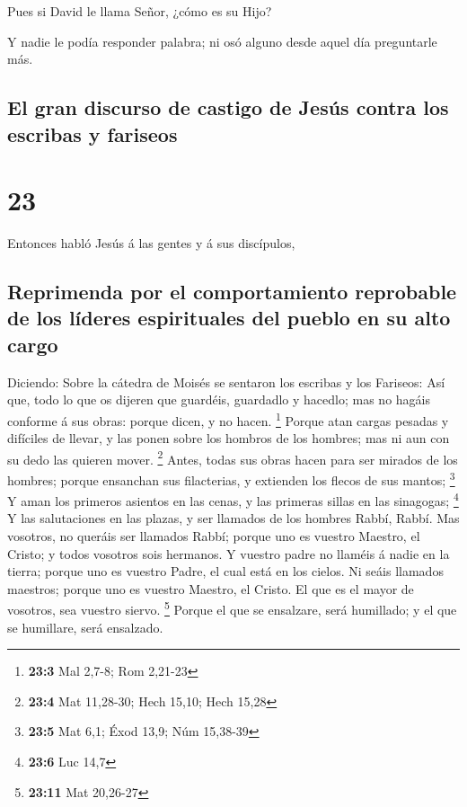  Pues si David le llama Señor, ¿cómo es su Hijo?

 Y nadie le podía responder palabra; ni osó alguno desde
aquel día preguntarle más.

\hypertarget{el-gran-discurso-de-castigo-de-jesuxfas-contra-los-escribas-y-fariseos}{%
\subsection{El gran discurso de castigo de Jesús contra los escribas y
fariseos}\label{el-gran-discurso-de-castigo-de-jesuxfas-contra-los-escribas-y-fariseos}}

\hypertarget{section-22}{%
\section{23}\label{section-22}}

 Entonces habló Jesús á las gentes y á sus discípulos,

\hypertarget{reprimenda-por-el-comportamiento-reprobable-de-los-luxedderes-espirituales-del-pueblo-en-su-alto-cargo}{%
\subsection{Reprimenda por el comportamiento reprobable de los líderes
espirituales del pueblo en su alto
cargo}\label{reprimenda-por-el-comportamiento-reprobable-de-los-luxedderes-espirituales-del-pueblo-en-su-alto-cargo}}

 Diciendo: Sobre la cátedra de Moisés se sentaron los
escribas y los Fariseos:  Así que, todo lo que os dijeren
que guardéis, guardadlo y hacedlo; mas no hagáis conforme á sus obras:
porque dicen, y no hacen. \footnote{\textbf{23:3} Mal 2,7-8; Rom 2,21-23}
 Porque atan cargas pesadas y difíciles de llevar, y las
ponen sobre los hombros de los hombres; mas ni aun con su dedo las
quieren mover. \footnote{\textbf{23:4} Mat 11,28-30; Hech 15,10; Hech
  15,28}  Antes, todas sus obras hacen para ser mirados de
los hombres; porque ensanchan sus filacterias, y extienden los flecos de
sus mantos; \footnote{\textbf{23:5} Mat 6,1; Éxod 13,9; Núm 15,38-39}
 Y aman los primeros asientos en las cenas, y las primeras
sillas en las sinagogas; \footnote{\textbf{23:6} Luc 14,7}
 Y las salutaciones en las plazas, y ser llamados de los
hombres Rabbí, Rabbí.  Mas vosotros, no queráis ser
llamados Rabbí; porque uno es vuestro Maestro, el Cristo; y todos
vosotros sois hermanos.  Y vuestro padre no llaméis á
nadie en la tierra; porque uno es vuestro Padre, el cual está en los
cielos.  Ni seáis llamados maestros; porque uno es
vuestro Maestro, el Cristo.  El que es el mayor de
vosotros, sea vuestro siervo. \footnote{\textbf{23:11} Mat 20,26-27}
 Porque el que se ensalzare, será humillado; y el que se
humillare, será ensalzado.

